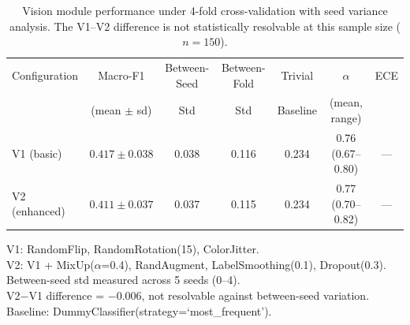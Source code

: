 
\begin{table}[htbp]
\centering
\small
\begin{tabular}{@{}lcccccc@{}}
\toprule
Configuration & Macro-F1 & Between-Seed & Between-Fold & Trivial & $\alpha$ & ECE \\
              & (mean $\pm$ sd) & Std & Std & Baseline & (mean, range) & \\
\midrule
V1 (basic)    & $0.417 \pm 0.038$ & 0.038 & 0.116 & 0.234 & 0.76 (0.67--0.80) & --- \\
V2 (enhanced) & $0.411 \pm 0.037$ & 0.037 & 0.115 & 0.234 & 0.77 (0.70--0.82) & --- \\
\bottomrule
\end{tabular}

\vspace{0.5em}
{\footnotesize
V1: RandomFlip, RandomRotation(15), ColorJitter. \\
V2: V1 + MixUp($\alpha$=0.4), RandAugment, LabelSmoothing(0.1), Dropout(0.3). \\
Between-seed std measured across 5 seeds (0--4). \\
V2$-$V1 difference = $-0.006$, not resolvable against between-seed variation. \\
Baseline: DummyClassifier(strategy=`most\_frequent').
}
\caption{Vision module performance under 4-fold cross-validation with seed variance analysis.
The V1--V2 difference is not statistically resolvable at this sample size ($n=150$).}
\label{tab:vision_performance}
\end{table}
